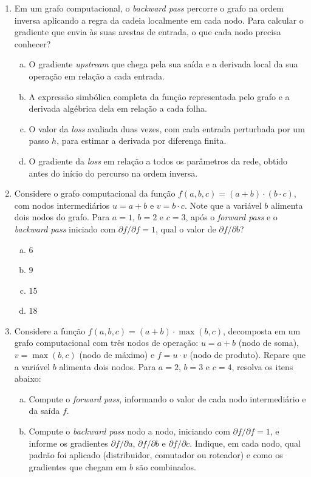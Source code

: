 \documentclass{dlproblemset}
\begin{document}
\begin{enumerate}[1)]
    \item Em um grafo computacional, o \textit{backward pass} percorre o grafo na ordem inversa aplicando a regra da cadeia localmente em cada nodo. Para calcular o gradiente que envia às suas arestas de entrada, o que cada nodo precisa conhecer?
    \begin{enumerate}[(a)]
        \item O gradiente \textit{upstream} que chega pela sua saída e a derivada local da sua operação em relação a cada entrada.
        \item A expressão simbólica completa da função representada pelo grafo e a derivada algébrica dela em relação a cada folha.
        \item O valor da \textit{loss} avaliada duas vezes, com cada entrada perturbada por um passo $h$, para estimar a derivada por diferença finita.
        \item O gradiente da \textit{loss} em relação a todos os parâmetros da rede, obtido antes do início do percurso na ordem inversa.
    \end{enumerate}

    \item Considere o grafo computacional da função $f(a,b,c) = (a + b)\cdot(b \cdot c)$, com nodos intermediários $u = a + b$ e $v = b \cdot c$. Note que a variável $b$ alimenta dois nodos do grafo. Para $a = 1$, $b = 2$ e $c = 3$, após o \textit{forward pass} e o \textit{backward pass} iniciado com $\partial f / \partial f = 1$, qual o valor de $\partial f / \partial b$?
    \begin{enumerate}[(a)]
        \item $6$
        \item $9$
        \item $15$
        \item $18$
    \end{enumerate}

    \item Considere a função $f(a,b,c) = (a + b)\cdot\max(b, c)$, decomposta em um grafo computacional com três nodos de operação: $u = a + b$ (nodo de soma), $v = \max(b, c)$ (nodo de máximo) e $f = u \cdot v$ (nodo de produto). Repare que a variável $b$ alimenta dois nodos. Para $a = 2$, $b = 3$ e $c = 4$, resolva os itens abaixo:
    \begin{enumerate}[a)]
        \item Compute o \textit{forward pass}, informando o valor de cada nodo intermediário e da saída $f$.
        \item Compute o \textit{backward pass} nodo a nodo, iniciando com $\partial f/\partial f = 1$, e informe os gradientes $\partial f/\partial a$, $\partial f/\partial b$ e $\partial f/\partial c$. Indique, em cada nodo, qual padrão foi aplicado (distribuidor, comutador ou roteador) e como os gradientes que chegam em $b$ são combinados.
    \end{enumerate}


\end{enumerate}
\end{document}
